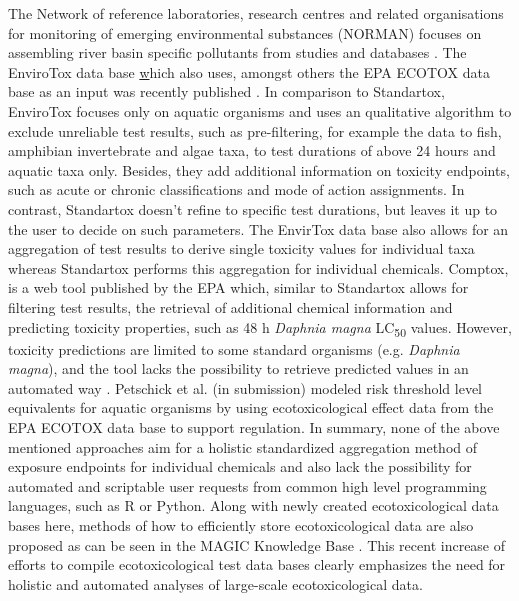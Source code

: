 The Network of reference laboratories, research centres and related organisations for monitoring of emerging environmental substances (NORMAN) focuses on assembling river basin specific pollutants from studies and databases \citep{von_der_ohe_new_2011}. The EnviroTox data base \href{https://envirotoxdatabase.org/} which also uses, amongst others the EPA ECOTOX data base as an input was recently published \citep{healthandenvironmentalsciencesinstitutehesi_envirotox_2019, connors_creation_2019}. In comparison to Standartox, EnviroTox focuses only on aquatic organisms and uses an qualitative algorithm to exclude unreliable test results, such as pre-filtering, for example the data to fish, amphibian invertebrate and algae taxa, to test durations of above 24 hours and aquatic taxa only. Besides, they add additional information on toxicity endpoints, such as acute or chronic classifications and mode of action assignments. In contrast, Standartox doesn't refine to specific test durations, but leaves it up to the user to decide on such parameters. The EnvirTox data base also allows for an aggregation of test results to derive single toxicity values for individual taxa whereas Standartox performs this aggregation for individual chemicals. Comptox, is a web tool published by the EPA which, similar to Standartox allows for filtering test results, the retrieval of additional chemical information and predicting toxicity properties, such as 48 h \textit{Daphnia magna} LC\textsubscript{50} values. However, toxicity predictions are limited to some standard organisms (e.g. \textit{Daphnia magna}), and the tool lacks the possibility to retrieve predicted values in an automated way \citep{williams_comptox_2017}. Petschick et al. (in submission) modeled risk threshold level equivalents for aquatic organisms by using ecotoxicological effect data from the EPA ECOTOX data base to support regulation. In summary, none of the above mentioned approaches aim for a holistic standardized aggregation method of exposure endpoints for individual chemicals and also lack the possibility for automated and scriptable user requests from common high level programming languages, such as R or Python. Along with newly created ecotoxicological data bases here, methods of how to efficiently store ecotoxicological data are also proposed as can be seen in the MAGIC Knowledge Base \citep{bub_graphing_2019}. This recent increase of efforts to compile ecotoxicological test data bases clearly emphasizes the need for holistic and automated analyses of large-scale ecotoxicological data. 

